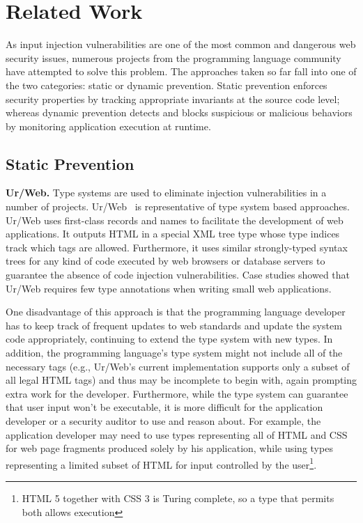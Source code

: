 \section{Related Work\label{sec:Related-Work}}


As input injection vulnerabilities are one of the most common and dangerous web security
issues, numerous projects from the programming language community
have attempted to solve this problem. The approaches taken so far fall into one of the two categories: static or dynamic prevention. Static prevention enforces security properties by tracking appropriate invariants at the source code level; whereas dynamic prevention detects and blocks suspicious or malicious behaviors by monitoring application execution at runtime.


\subsection{Static Prevention}

\textbf{Ur/Web.} Type systems are used to eliminate injection vulnerabilities
in a number of projects. Ur/Web~\cite{urOSDI, ur/Web} is representative of type system based approaches. Ur/Web uses first-class
records and names to facilitate the development of web applications.
It outputs HTML in a special XML tree type whose type indices track
which tags are allowed. Furthermore, it uses similar strongly-typed
syntax trees for any kind of code executed by web browsers or database
servers to guarantee the absence of code injection vulnerabilities. Case studies
showed that Ur/Web requires few type annotations when writing small
web applications.

One disadvantage of this approach is that the programming language
developer has to keep track of frequent updates to web standards and
update the system code appropriately, continuing to extend the type
system with new types. In addition, the programming language's type
system might not include all of the necessary tags (e.g.,
Ur/Web's current implementation supports only a subset of all legal HTML tags)
and thus may be incomplete to begin with,
again prompting extra work for the developer. Furthermore, while
the type system can guarantee that user input won't be executable,
it is more difficult for the application developer or a security auditor
to use and reason about.  For example, the application developer may need to use
types representing all of HTML and CSS for web page fragments produced
solely by his application, while using types representing a limited subset of HTML
for input controlled by the user\footnote{HTML 5 together with CSS 3 is Turing
complete, so a type that permits both allows execution}.  

